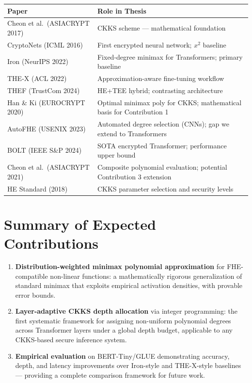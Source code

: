 \documentclass[12pt, a4paper]{article}
\begin{document}
\renewcommand{\arraystretch}{1.2}
\begin{tabular}{p{} p{}}
\toprule
\textbf{Paper} & \textbf{Role in Thesis} \\
\midrule
Cheon et al.\ (ASIACRYPT 2017)~\cite{cheon2017} & CKKS scheme — mathematical foundation \\
CryptoNets (ICML 2016)~\cite{cryptonets} & First encrypted neural network; $x^2$ baseline \\
Iron (NeurIPS 2022)~\cite{iron} & Fixed-degree minimax for Transformers; primary baseline \\
THE-X (ACL 2022)~\cite{thex} & Approximation-aware fine-tuning workflow \\
THEF (TrustCom 2024)~\cite{thef} & HE+TEE hybrid; contrasting architecture \\
Han \& Ki (EUROCRYPT 2020)~\cite{han2020} & Optimal minimax poly for CKKS; mathematical basis for Contribution 1 \\
AutoFHE (USENIX 2023)~\cite{autofhe} & Automated degree selection (CNNs); gap we extend to Transformers \\
BOLT (IEEE S\&P 2024)~\cite{bolt} & SOTA encrypted Transformer; performance upper bound \\
Cheon et al.\ (ASIACRYPT 2021)~\cite{cheon2021} & Composite polynomial evaluation; potential Contribution 3 extension \\
HE Standard (2018)~\cite{hestandard} & CKKS parameter selection and security levels \\
\bottomrule
\end{tabular}

\section{Summary of Expected Contributions}

\begin{enumerate}[leftmargin=2em, label=\textbf{C\arabic*.}]
  \item \textbf{Distribution-weighted minimax polynomial approximation} for FHE-compatible non-linear functions: a mathematically rigorous generalization of standard minimax that exploits empirical activation densities, with provable error bounds.

  \item \textbf{Layer-adaptive CKKS depth allocation} via integer programming: the first systematic framework for assigning non-uniform polynomial degrees across Transformer layers under a global depth budget, applicable to any CKKS-based secure inference system.

  \item \textbf{Empirical evaluation} on BERT-Tiny/GLUE demonstrating accuracy, depth, and latency improvements over Iron-style and THE-X-style baselines — providing a complete comparison framework for future work.
\end{enumerate}
\end{document}
